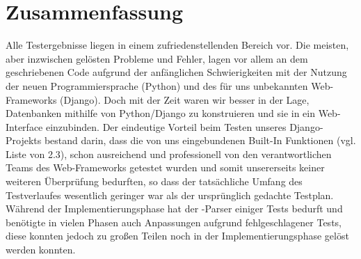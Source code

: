 

\chapter{Zusammenfassung}
Alle Testergebnisse liegen in einem zufriedenstellenden Bereich vor.  Die
meisten, aber inzwischen gelösten Probleme und Fehler, lagen vor allem an dem
geschriebenen Code aufgrund der anfänglichen Schwierigkeiten mit der Nutzung
der neuen Programmiersprache (Python) und des für uns unbekannten
Web-Frameworks (Django).
Doch mit der Zeit waren wir besser in der Lage, Datenbanken mithilfe von
Python/Django zu konstruieren und sie in ein Web-Interface einzubinden.  Der
eindeutige Vorteil beim Testen unseres Django-Projekts bestand darin, dass die
von uns eingebundenen Built-In Funktionen (vgl. Liste von 2.3), schon
ausreichend und professionell von den verantwortlichen Teams des Web-Frameworks
getestet wurden und somit unsererseits keiner weiteren Überprüfung bedurften,
so dass der tatsächliche Umfang des Testverlaufes wesentlich geringer war als
der ursprünglich gedachte Testplan. 
Während der Implementierungsphase hat der \BibTeX -Parser einiger Tests bedurft
und benötigte in vielen Phasen auch Anpassungen aufgrund fehlgeschlagener
Tests, diese konnten jedoch zu großen Teilen noch in der
Implementierungsphase gelöst werden konnten.
